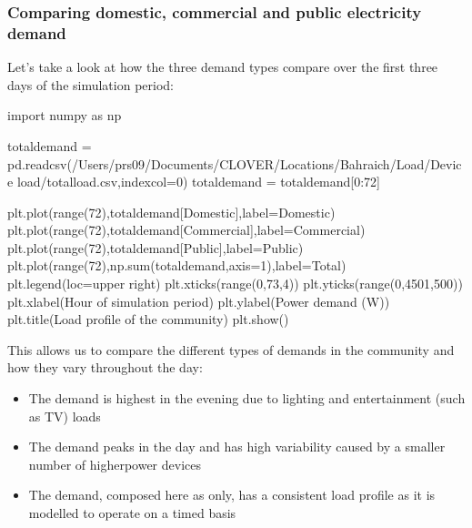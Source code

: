 \documentclass[letterpaper,10pt,english]{sphinxmanual}
\begin{document}
\subsubsection{Comparing domestic, commercial and public electricity demand}
\label{\detokenize{load:comparing-domestic-commercial-and-public-electricity-demand}}
\sphinxAtStartPar
Let’s take a look at how the three demand types compare over the first
three days of the simulation period:

\begin{sphinxVerbatim}[commandchars=\\\{\}]
import numpy as np

total\PYGZus{}demand = pd.read\PYGZus{}csv(\PYGZdq{}/Users/prs09/Documents/CLOVER/Locations/Bahraich/Load/Device load/total\PYGZus{}load.csv\PYGZdq{},index\PYGZus{}col=0)
total\PYGZus{}demand = total\PYGZus{}demand[0:72]

plt.plot(range(72),total\PYGZus{}demand[\PYGZsq{}Domestic\PYGZsq{}],label=\PYGZsq{}Domestic\PYGZsq{})
plt.plot(range(72),total\PYGZus{}demand[\PYGZsq{}Commercial\PYGZsq{}],label=\PYGZsq{}Commercial\PYGZsq{})
plt.plot(range(72),total\PYGZus{}demand[\PYGZsq{}Public\PYGZsq{}],label=\PYGZsq{}Public\PYGZsq{})
plt.plot(range(72),np.sum(total\PYGZus{}demand,axis=1),label=\PYGZsq{}Total\PYGZsq{})
plt.legend(loc=\PYGZsq{}upper right\PYGZsq{})
plt.xticks(range(0,73,4))
plt.yticks(range(0,4501,500))
plt.xlabel(\PYGZsq{}Hour of simulation period\PYGZsq{})
plt.ylabel(\PYGZsq{}Power demand (W)\PYGZsq{})
plt.title(\PYGZsq{}Load profile of the community\PYGZsq{})
plt.show()
\end{sphinxVerbatim}

\noindent{}

\sphinxAtStartPar
This allows us to compare the different types of demands in the
community and how they vary throughout the day:
\begin{itemize}
\item {} 
\sphinxAtStartPar
The  demand is highest in the evening due to lighting and entertainment (such as TV) loads

\item {} 
\sphinxAtStartPar
The  demand peaks in the day and has high variability caused by a smaller number of higher\sphinxhyphen{}power devices

\item {} 
\sphinxAtStartPar
The  demand, composed here as  only, has a consistent load profile as it is modelled to operate on a timed basis

\end{itemize}
\end{document}
